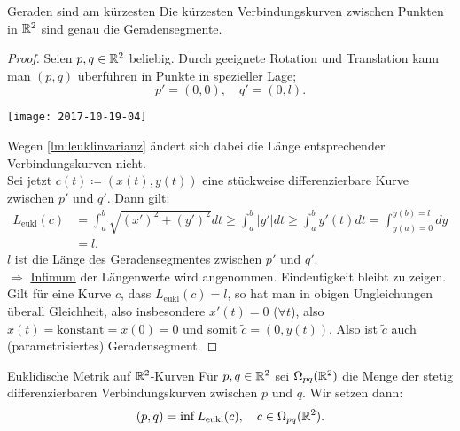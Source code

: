 \begin{lemma}{Geraden sind am kürzesten}
  \label{lemma:geradenkurz}
  Die kürzesten Verbindungskurven zwischen Punkten in $ \mathbb{R}^2 $ sind genau die Geradensegmente. \\
  \begin{proof}
    Seien $ p, q \in \mathbb{R}^2 $ beliebig. Durch geeignete Rotation und Translation kann man $ (p,q) $ überführen in Punkte in spezieller Lage;
    \begin{equation*}
      p' = (0,0), \quad q' = (0,l)\text{.}
    \end{equation*}
    \begin{marginfigure}
      \texttt{[image: 2017-10-19-04]}
      \caption{Verschiebung von $ p $ und $ q $ auf $ p' $ und $ q' $.}
    \end{marginfigure}
    Wegen \autoref{lm:leuklinvarianz} ändert sich dabei die Länge entsprechender Verbindungskurven nicht. \\
    Sei jetzt $ c(t) \coloneqq (x(t),y(t)) $ eine stückweise differenzierbare Kurve zwischen $ p' $ und $ q' $. Dann gilt:
    \begin{align*}
      L_\text{eukl}(c) &= \int_a^b\sqrt{(x')^2+(y')^2}dt \geq \int_a^b\vert y' \vert dt \geq \int_a^by'(t)dt = \int_{y(a) = 0}^{y(b) = l} dy \\
       &= l\text{.}
    \end{align*}
    $ l $ ist die Länge des Geradensegmentes zwischen $ p' $ und $ q' $. \\
    $ \Rightarrow $ \underline{Infimum} der Längenwerte wird angenommen. Eindeutigkeit bleibt zu zeigen. \\
    Gilt für eine Kurve $ c $, dass $ L_\text{eukl}(c) = l $, so hat man in obigen Ungleichungen überall Gleichheit, also insbesondere $ x'(t) = 0 $ ($ \forall t $), also $ x(t) = \text{konstant} = x(0) = 0 $ und somit $ \widetilde{c} = (0,y(t)) $. Also ist $ \widetilde{c} $ auch (parametrisiertes) Geradensegment.
  \end{proof}
\end{lemma}

\begin{definition}{Euklidische Metrik auf $ \mathbb{R}^2 $-Kurven}
  Für $ p,q \in \mathbb{R}^2 $ sei $ \Omega_{pq}(\mathbb{R}^2) $ die Menge der stetig differenzierbaren Verbindungskurven zwischen $ p $ und $ q $. Wir setzen dann:
  \begin{equation*}
    (p,q) = \inf L_\text{eukl}(c), \quad c \in \Omega_{pq}(\mathbb{R}^2)\text{.}
  \end{equation*}
\end{definition}

